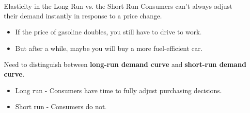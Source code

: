 \documentclass[12pt,t]{beamer}
\begin{document}
\begin{frame}{Elasticity in the Long Run vs. the Short Run}
  Consumers can't always adjust their demand instantly in response to a price change.
  \begin{itemize}
    \item If the price of gasoline doubles, you still have to drive to work.

    \item But after a while, maybe you will buy a more fuel-efficient car.
  \end{itemize}

  \pause\bigskip
  Need to distinguish between \textbf{long-run demand curve} and \textbf{short-run demand curve}.
  \begin{itemize}
    \item Long run - Consumers have time to fully adjust purchasing decisions.

    \item Short run - Consumers do not.
  \end{itemize}
\end{frame}
\end{document}

